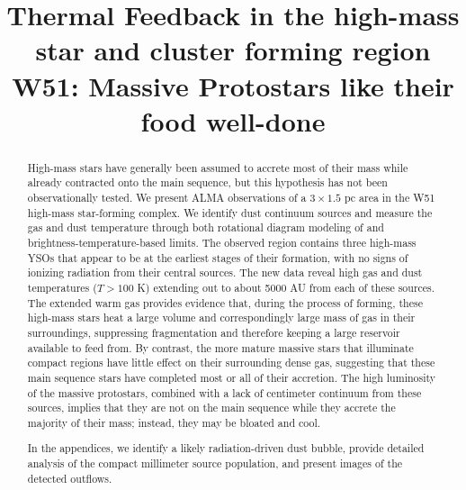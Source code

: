 \documentclass{emulateapj}
\begin{document}
\title{Thermal Feedback in the high-mass star and cluster forming region W51:
       Massive Protostars like their food well-done}




\begin{abstract}
    High-mass stars have generally been assumed to accrete most of their
    mass while already contracted onto the main sequence, but this
    hypothesis has not been observationally tested.
    We present ALMA observations of a $3\times1.5$ pc area in the W51
    high-mass star-forming complex.  We identify dust continuum sources and
    measure the gas and dust temperature through both rotational diagram
    modeling of \methanol and brightness-temperature-based limits.  The
    observed region contains three high-mass YSOs that appear to be at the
    earliest stages of their formation, with no signs of ionizing radiation
    from their central sources.  The new data reveal  high gas and dust
    temperatures ($T > 100$ K) extending out to about 5000 AU from each of
    these sources.
    The extended warm gas provides evidence that, during the process of
    forming, these high-mass stars heat a large volume and correspondingly
    large mass of gas in their surroundings, suppressing fragmentation and
    therefore keeping a large reservoir available to feed from.  By contrast,
    the more mature massive stars that illuminate compact \hii regions have
    little effect on their surrounding dense gas, suggesting that these main
    sequence stars have completed most or all of their accretion.  
    The high luminosity of the massive protostars, combined with a lack of
    centimeter continuum from these sources, implies that they are not on
    the main sequence while they accrete the majority of their mass; instead,
    they may be bloated and cool.

    In the appendices, we identify a likely radiation-driven dust bubble,
    provide detailed analysis of the compact millimeter source population, and
    present images of the detected outflows.
    

\end{abstract}
\end{document}
